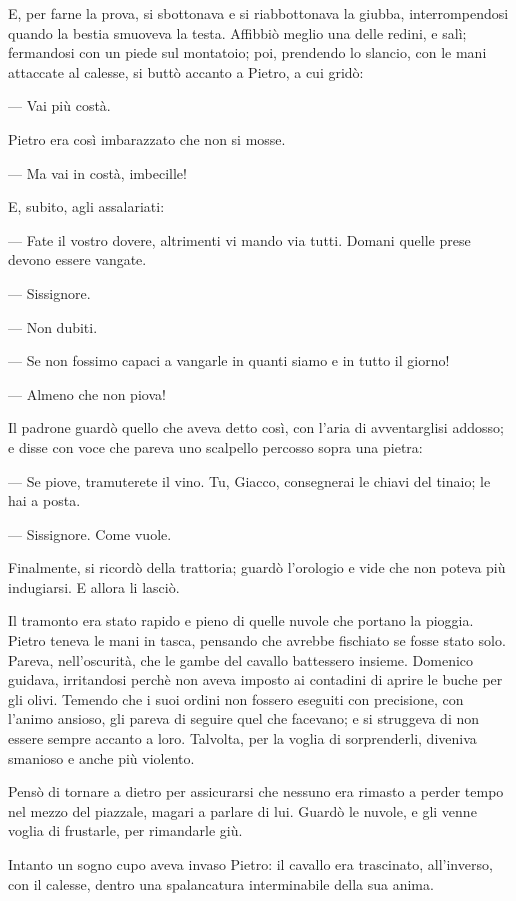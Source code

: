 E, per farne la prova, si sbottonava e si riabbottonava la giubba, interrompendosi quando la bestia smuoveva la testa. Affibbiò meglio una delle redini, e salì; fermandosi con un piede sul montatoio; poi, prendendo lo slancio, con le mani attaccate al calesse, si buttò accanto a Pietro, a cui gridò:

— Vai più costà.

Pietro era così imbarazzato che non si mosse.

— Ma vai in costà, imbecille!

E, subito, agli assalariati:

— Fate il vostro dovere, altrimenti vi mando via tutti. Domani quelle prese devono essere vangate.

— Sissignore.

— Non dubiti.

— Se non fossimo capaci a vangarle in quanti siamo e in tutto il giorno!

— Almeno che non piova!

Il padrone guardò quello che aveva detto così, con l’aria di avventarglisi addosso; e disse con voce che pareva uno scalpello percosso sopra una pietra:

— Se piove, tramuterete il vino. Tu, Giacco, consegnerai le chiavi del tinaio; le hai a posta.

— Sissignore. Come vuole.

Finalmente, si ricordò della trattoria; guardò l’orologio e vide che non poteva più indugiarsi. E allora li lasciò.

Il tramonto era stato rapido e pieno di quelle nuvole che portano la pioggia. Pietro teneva le mani in tasca, pensando che avrebbe fischiato se fosse stato solo. Pareva, nell’oscurità, che le gambe del cavallo battessero insieme. Domenico guidava, irritandosi perchè non aveva imposto ai contadini di aprire le buche per gli olivi. Temendo che i suoi ordini non fossero eseguiti con precisione, con l’animo ansioso, gli pareva di seguire quel che facevano; e si struggeva di non essere sempre accanto a loro. Talvolta, per la voglia di sorprenderli, diveniva smanioso e anche più violento.

Pensò di tornare a dietro per assicurarsi che nessuno era rimasto a perder tempo nel mezzo del piazzale, magari a parlare di lui. Guardò le nuvole, e gli venne voglia di frustarle, per rimandarle giù.

Intanto un sogno cupo aveva invaso Pietro: il cavallo era trascinato, all’inverso, con il calesse, dentro una spalancatura interminabile della sua anima.

